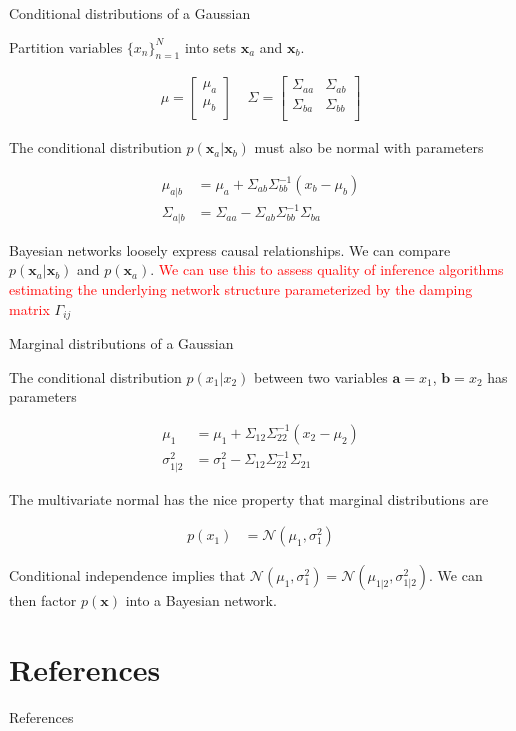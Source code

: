 \documentclass[aspectratio=1610]{beamer}					%
\begin{document}
\begin{frame}{Conditional distributions of a Gaussian}

Partition variables $\{x_{n}\}_{n=1}^{N}$ into sets $\bm{x}_{a}$ and $\bm{x}_{b}$. 

\begin{align*}
\mu = \begin{bmatrix} 
    \mu_{a}\\
	\mu_{b}\\
    \end{bmatrix}
\;\;\;\;
\Sigma = \begin{bmatrix} 
    \Sigma_{aa} & \Sigma_{ab}\\
    \Sigma_{ba} & \Sigma_{bb}\\
    \end{bmatrix}
\end{align*}

The conditional distribution $p(\bm{x}_{a}|\bm{x}_{b})$ must also be normal with parameters

\begin{align*}
\mu_{a|b} &= \mu_{a} + \Sigma_{ab}\Sigma_{bb}^{-1}(x_{b}-\mu_{b})\\
\Sigma_{a|b} &= \Sigma_{aa}-\Sigma_{ab}\Sigma_{bb}^{-1}\Sigma_{ba}
\end{align*}

Bayesian networks loosely express causal relationships. We can compare $p(\bm{x}_{a}|\bm{x}_{b})$ and $p(\bm{x}_{a})$. \textcolor{red}{We can use this to assess quality of inference algorithms estimating the underlying network structure parameterized by the damping matrix} $\Gamma_{ij}$

\end{frame}

\begin{frame}{Marginal distributions of a Gaussian}

The conditional distribution $p(x_{1}|x_{2})$ between two variables $\bm{a}=x_{1}$, $\bm{b}=x_{2}$ has parameters

\begin{align*}
\mu_{1} &= \mu_{1} + \Sigma_{12}\Sigma_{22}^{-1}(x_{2}-\mu_{2})\\
\sigma_{1|2}^{2} &= \sigma_{1}^{2} -\Sigma_{12}\Sigma_{22}^{-1}\Sigma_{21}
\end{align*}

The multivariate normal has the nice property that marginal distributions are

\begin{align*}
p(x_{1}) &= \mathcal{N}\left(\mu_{1},\sigma_{1}^{2}\right)
\end{align*}

Conditional independence implies that $\mathcal{N}\left(\mu_{1},\sigma_{1}^{2}\right) = \mathcal{N}\left(\mu_{1|2},\sigma_{1|2}^{2}\right)$. We can then factor $p(\bm{x})$ into a Bayesian network. \\


\end{frame}

\section{References}

\begin{frame}[allowframebreaks]{References}
	\tiny
	
\end{frame}
\end{document}

